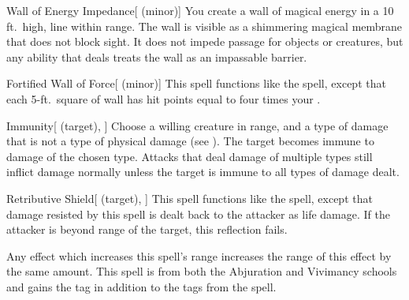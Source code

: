 \lowercase{\hypertarget{spell:Wall of Energy Impedance}{}}\label{spell:Wall of Energy Impedance}
\begin{freeability}[\nth{2}]{\hypertarget{spell:Wall of Energy Impedance}{Wall of Energy Impedance}}[ (minor)]
You create a wall of magical energy in a 10 ft.\ high, \areamed line within \rngmed range.
The wall is visible as a shimmering magical membrane that does not block sight.
It does not impede passage for objects or creatures, but any ability that deals  treats the wall as an impassable barrier.
\end{freeability}
\vspace{0.25em}



\lowercase{\hypertarget{spell:Fortified Wall of Force}{}}\label{spell:Fortified Wall of Force}
\begin{freeability}[\nth{3}]{\hypertarget{spell:Fortified Wall of Force}{Fortified Wall of Force}}[ (minor)]
This spell functions like the  spell, except that each 5-ft.\ square of wall has hit points equal to four times your .
\end{freeability}
\vspace{0.25em}



\lowercase{\hypertarget{spell:Immunity}{}}\label{spell:Immunity}
\begin{attuneability}[\nth{3}]{\hypertarget{spell:Immunity}{Immunity}}[ (target), ]
Choose a willing creature in \rngclose range, and a type of damage that is not a type of physical damage (see ).
The target becomes immune to damage of the chosen type.
Attacks that deal damage of multiple types still inflict damage normally unless the target is immune to all types of damage dealt.
\end{attuneability}
\vspace{0.25em}



\lowercase{\hypertarget{spell:Retributive Shield}{}}\label{spell:Retributive Shield}
\begin{attuneability}[\nth{3}]{\hypertarget{spell:Retributive Shield}{Retributive Shield}}[ (target), ]
This spell functions like the  spell, except that damage resisted by this spell is dealt back to the attacker as life damage.
If the attacker is beyond \rngclose range of the target, this reflection fails.

Any effect which increases this spell's range increases the range of this effect by the same amount.
This spell is from both the Abjuration and Vivimancy schools and gains the  tag in addition to the tags from the  spell.
\end{attuneability}
\vspace{0.25em}



